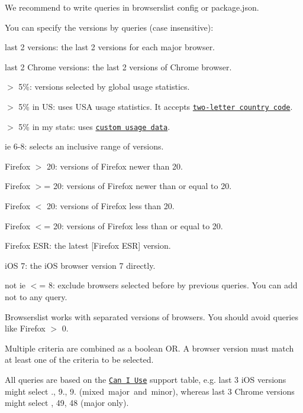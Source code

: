 We recommend to write queries in {\ttfamily browserslist} config or {\ttfamily package.\+json}.

You can specify the versions by queries (case insensitive)\+:


\begin{DoxyItemize}
\item {\ttfamily last 2 versions}\+: the last 2 versions for each major browser.
\item {\ttfamily last 2 Chrome versions}\+: the last 2 versions of Chrome browser.
\item {\ttfamily $>$ 5\%}\+: versions selected by global usage statistics.
\item {\ttfamily $>$ 5\% in US}\+: uses U\+SA usage statistics. It accepts \href{http://en.wikipedia.org/wiki/ISO_3166-1_alpha-2#Officially_assigned_code_elements}{\tt two-\/letter country code}.
\item {\ttfamily $>$ 5\% in my stats}\+: uses \href{#custom-usage-data}{\tt custom usage data}.
\item {\ttfamily ie 6-\/8}\+: selects an inclusive range of versions.
\item {\ttfamily Firefox $>$ 20}\+: versions of Firefox newer than 20.
\item {\ttfamily Firefox $>$= 20}\+: versions of Firefox newer than or equal to 20.
\item {\ttfamily Firefox $<$ 20}\+: versions of Firefox less than 20.
\item {\ttfamily Firefox $<$= 20}\+: versions of Firefox less than or equal to 20.
\item {\ttfamily Firefox E\+SR}\+: the latest \mbox{[}Firefox E\+SR\mbox{]} version.
\item {\ttfamily i\+OS 7}\+: the i\+OS browser version 7 directly.
\item {\ttfamily not ie $<$= 8}\+: exclude browsers selected before by previous queries. You can add {\ttfamily not} to any query.
\end{DoxyItemize}

Browserslist works with separated versions of browsers. You should avoid queries like {\ttfamily Firefox $>$ 0}.

Multiple criteria are combined as a boolean {\ttfamily OR}. A browser version must match at least one of the criteria to be selected.

All queries are based on the \href{http://caniuse.com/}{\tt Can I Use} support table, e.\+g. {\ttfamily last 3 i\+OS versions} might select {., 9., 9.} (mixed major and minor), whereas {\ttfamily last 3 Chrome versions} might select {, 49, 48} (major only).

